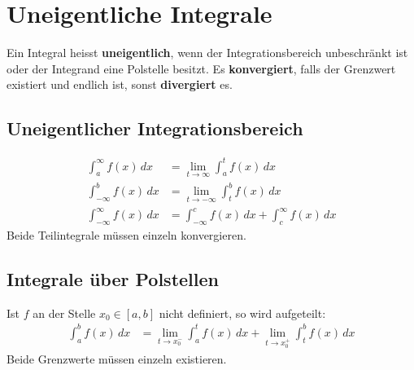 \section{Uneigentliche Integrale}
Ein Integral heisst \textbf{uneigentlich}, wenn der Integrationsbereich unbeschränkt ist oder der Integrand eine Polstelle besitzt. Es \textbf{konvergiert}, falls der Grenzwert existiert und endlich ist, sonst \textbf{divergiert} es.

\subsection{Uneigentlicher Integrationsbereich}
\begin{align*}
    \int_a^\infty f(x)\,dx &= \lim_{t\to \infty} \int_a^t f(x)\,dx \\
    \int_{-\infty}^b f(x)\,dx &= \lim_{t\to -\infty} \int_t^b f(x)\,dx \\
    \int_{-\infty}^{\infty} f(x)\,dx &= \int_{-\infty}^{c} f(x)\,dx + \int_{c}^{\infty} f(x)\,dx
\end{align*}
Beide Teilintegrale müssen einzeln konvergieren.

\subsection{Integrale über Polstellen}
Ist \(f\) an der Stelle \(x_0 \in [a,b]\) nicht definiert, so wird aufgeteilt:
\begin{align*}
    \int_a^b f(x)\,dx &= \lim_{t\to x_0^-} \int_a^t f(x)\,dx + \lim_{t\to x_0^+} \int_t^b f(x)\,dx
\end{align*}
Beide Grenzwerte müssen einzeln existieren.
